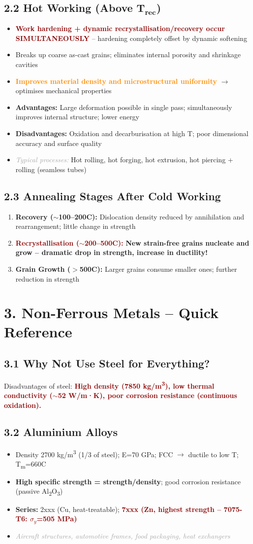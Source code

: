 \documentclass[11pt,a4paper]{article}
\newcommand{\mysec}[1]{\section*{#1}}
\newcommand{\mysubsec}[1]{\subsection*{#1}}
\newcommand{\CRIT}[1]{\textcolor{DarkRed}{\textbf{#1}}}
\newcommand{\IMP}[1]{\textcolor{DarkOrange}{\textbf{#1}}}
\newcommand{\KEY}[1]{\textcolor{SecondaryDark}{\textbf{#1}}}
\newcommand{\EXA}[1]{\textcolor{DarkGray}{\textit{#1}}}
\newcommand{\HI}[1]{\colorbox{yellow!20}{\textcolor{DarkPurple}{\textbf{#1}}}}
\begin{document}
\mysubsec{2.2 Hot Working (Above $\mathbf{T_{rec}}$)}

\begin{itemize}[leftmargin=*,nosep]
    \item \CRIT{Work hardening + dynamic recrystallisation/recovery occur SIMULTANEOUSLY} -- hardening completely offset by dynamic softening
    \item Breaks up coarse as-cast grains; eliminates internal porosity and shrinkage cavities
    \item \IMP{Improves material density and microstructural uniformity} $\to$ optimises mechanical properties
    \item \textbf{Advantages:} Large deformation possible in single pass; simultaneously improves internal structure; lower energy
    \item \textbf{Disadvantages:} Oxidation and decarburisation at high T; poor dimensional accuracy and surface quality
    \item \EXA{Typical processes:} Hot rolling, hot forging, hot extrusion, hot piercing + rolling (seamless tubes)
\end{itemize}

\mysubsec{2.3 Annealing Stages After Cold Working}

\begin{enumerate}[leftmargin=*,nosep]
    \item \KEY{Recovery ($\sim$100--200\textdegree C):} Dislocation density reduced by annihilation and rearrangement; little change in strength
    \item \CRIT{Recrystallisation ($\sim$200--500\textdegree C):} \textbf{New strain-free grains nucleate and grow -- dramatic drop in strength, increase in ductility!}
    \item \KEY{Grain Growth ($>$500\textdegree C):} Larger grains consume smaller ones; further reduction in strength
\end{enumerate}

\newpage
\mysec{3. Non-Ferrous Metals -- Quick Reference}

\mysubsec{3.1 Why Not Use Steel for Everything?}
Disadvantages of steel: \CRIT{High density (7850 kg/m\textsuperscript{3}), low thermal conductivity ($\sim$52 W/m·K), poor corrosion resistance (continuous oxidation).}

\mysubsec{3.2 Aluminium Alloys}
\begin{itemize}[leftmargin=*,nosep]
    \item Density 2700 kg/m\textsuperscript{3} (1/3 of steel); E=70 GPa; FCC $\to$ ductile to low T; T\textsubscript{m}=660\textdegree C
    \item \HI{High specific strength = strength/density}; good corrosion resistance (passive Al\textsubscript{2}O\textsubscript{3})
    \item \textbf{Series:} 2xxx (Cu, heat-treatable); \CRIT{7xxx (Zn, highest strength -- 7075-T6: $\sigma_y$=505 MPa)}
    \item \EXA{Aircraft structures, automotive frames, food packaging, heat exchangers}
\end{itemize}
\end{document}
